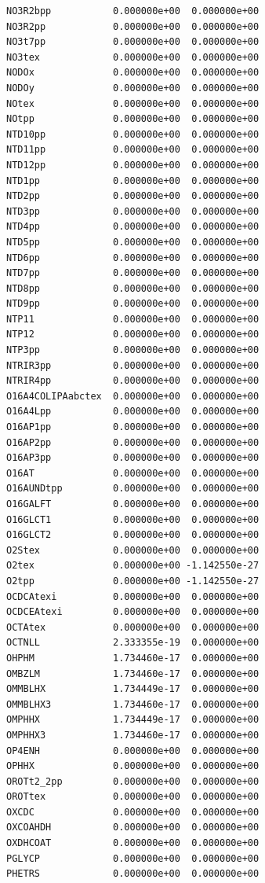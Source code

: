 \documentclass{scrartcl}
\begin{document}
\begin{enumerate}
\begin{lstlisting}
NO3R2bpp           0.000000e+00  0.000000e+00
NO3R2pp            0.000000e+00  0.000000e+00
NO3t7pp            0.000000e+00  0.000000e+00
NO3tex             0.000000e+00  0.000000e+00
NODOx              0.000000e+00  0.000000e+00
NODOy              0.000000e+00  0.000000e+00
NOtex              0.000000e+00  0.000000e+00
NOtpp              0.000000e+00  0.000000e+00
NTD10pp            0.000000e+00  0.000000e+00
NTD11pp            0.000000e+00  0.000000e+00
NTD12pp            0.000000e+00  0.000000e+00
NTD1pp             0.000000e+00  0.000000e+00
NTD2pp             0.000000e+00  0.000000e+00
NTD3pp             0.000000e+00  0.000000e+00
NTD4pp             0.000000e+00  0.000000e+00
NTD5pp             0.000000e+00  0.000000e+00
NTD6pp             0.000000e+00  0.000000e+00
NTD7pp             0.000000e+00  0.000000e+00
NTD8pp             0.000000e+00  0.000000e+00
NTD9pp             0.000000e+00  0.000000e+00
NTP11              0.000000e+00  0.000000e+00
NTP12              0.000000e+00  0.000000e+00
NTP3pp             0.000000e+00  0.000000e+00
NTRIR3pp           0.000000e+00  0.000000e+00
NTRIR4pp           0.000000e+00  0.000000e+00
O16A4COLIPAabctex  0.000000e+00  0.000000e+00
O16A4Lpp           0.000000e+00  0.000000e+00
O16AP1pp           0.000000e+00  0.000000e+00
O16AP2pp           0.000000e+00  0.000000e+00
O16AP3pp           0.000000e+00  0.000000e+00
O16AT              0.000000e+00  0.000000e+00
O16AUNDtpp         0.000000e+00  0.000000e+00
O16GALFT           0.000000e+00  0.000000e+00
O16GLCT1           0.000000e+00  0.000000e+00
O16GLCT2           0.000000e+00  0.000000e+00
O2Stex             0.000000e+00  0.000000e+00
O2tex              0.000000e+00 -1.142550e-27
O2tpp              0.000000e+00 -1.142550e-27
OCDCAtexi          0.000000e+00  0.000000e+00
OCDCEAtexi         0.000000e+00  0.000000e+00
OCTAtex            0.000000e+00  0.000000e+00
OCTNLL             2.333355e-19  0.000000e+00
OHPHM              1.734460e-17  0.000000e+00
OMBZLM             1.734460e-17  0.000000e+00
OMMBLHX            1.734449e-17  0.000000e+00
OMMBLHX3           1.734460e-17  0.000000e+00
OMPHHX             1.734449e-17  0.000000e+00
OMPHHX3            1.734460e-17  0.000000e+00
OP4ENH             0.000000e+00  0.000000e+00
OPHHX              0.000000e+00  0.000000e+00
OROTt2_2pp         0.000000e+00  0.000000e+00
OROTtex            0.000000e+00  0.000000e+00
OXCDC              0.000000e+00  0.000000e+00
OXCOAHDH           0.000000e+00  0.000000e+00
OXDHCOAT           0.000000e+00  0.000000e+00
PGLYCP             0.000000e+00  0.000000e+00
PHETRS             0.000000e+00  0.000000e+00

\end{lstlisting}
\end{enumerate}
\end{document}
